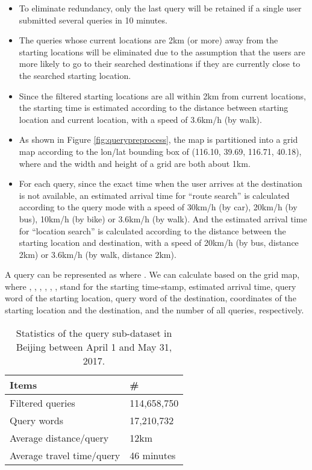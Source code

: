 \begin{itemize}
\item To eliminate redundancy, only the last query will be retained if a single user submitted several queries in 10 minutes.
\item  The queries whose current locations are 2km (or more) away from the starting locations will be eliminated due to the assumption that the users are more likely to go to their searched destinations if they are currently close to the searched starting location.
\item Since the filtered starting locations are all within 2km from current locations, the starting time is estimated according to the distance between starting location and current location, with a speed of 3.6km/h (by walk).
\item As shown in Figure \ref{fig:querypreprocess}, the map is partitioned into a  grid map according to the lon/lat bounding box of  (116.10, 39.69, 116.71, 40.18), where  and the width and height of a grid are both about 1km.
\item For each query, since the exact time when the user arrives at the destination is not available, an estimated arrival time  for ``route search'' is calculated according to the query mode with a speed of 30km/h (by car), 20km/h (by bus), 10km/h (by bike) or 3.6km/h (by walk). And the estimated arrival time  for ``location search'' is calculated according to the distance between the starting location and destination, with a speed of 20km/h (by bus, distance  2km) or 3.6km/h (by walk, distance  2km).
\end{itemize}

A query  can be represented as  where . We can calculate  based on the grid map, where , , , , , ,  stand for the starting time-stamp, estimated arrival time, query word of the starting location, query word of the destination, coordinates of the starting location and the destination, and the number of all queries, respectively. 

\begin{table}[htbp]
\centering
\caption{Statistics of the query sub-dataset in Beijing between April 1 and May 31, 2017.}
\label{tab:querystats}
\begin{tabular}{ll}
\toprule
Items & \#  \\
\midrule
Filtered queries & 114,658,750 \\
Query words & 17,210,732 \\
Average distance/query & 12km \\
Average travel time/query & 46 minutes \\
\bottomrule
\end{tabular}
\end{table}

